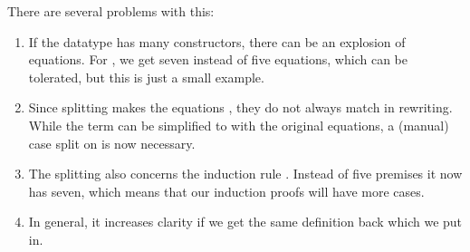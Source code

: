 \begin{isabellebody}
\begin{isamarkuptext}
  \vspace*{1em}
  \noindent There are several problems with this:

  \begin{enumerate}
  \item If the datatype has many constructors, there can be an
  explosion of equations. For , we get seven instead of
  five equations, which can be tolerated, but this is just a small
  example.

  \item Since splitting makes the equations , they
  do not always match in rewriting. While the term 
  can be simplified to  with the original equations, a
  (manual) case split on  is now necessary.

  \item The splitting also concerns the induction rule . Instead of five premises it now has seven, which
  means that our induction proofs will have more cases.

  \item In general, it increases clarity if we get the same definition
  back which we put in.
  \end{enumerate}


\end{isamarkuptext}
\end{isabellebody}
